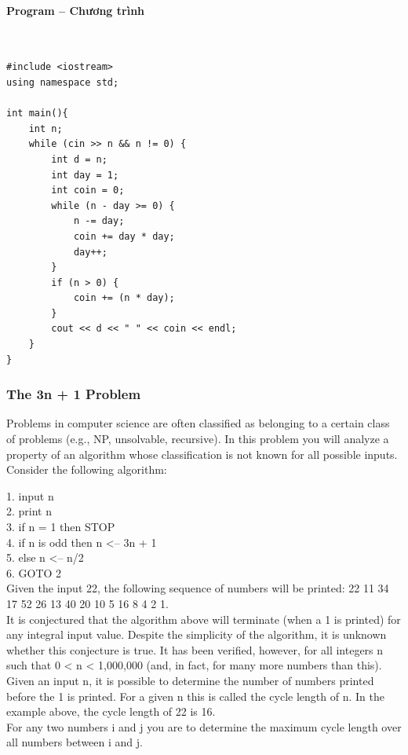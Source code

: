 \documentclass{article}
\begin{document}
\paragraph{Program -- Chương trình} \mbox{} \\


\begin{lstlisting}
#include <iostream>
using namespace std;

int main(){
	int n;
	while (cin >> n && n != 0) {
		int d = n;
		int day = 1;
		int coin = 0;
		while (n - day >= 0) {
			n -= day;
			coin += day * day;
			day++;
		}
		if (n > 0) {
			coin += (n * day);
		}
		cout << d << " " << coin << endl;
	}
}
\end{lstlisting}


\subsubsection{The 3n + 1 Problem}

Problems in computer science are often classified as belonging to a certain class of problems (e.g.,
NP, unsolvable, recursive). In this problem you will analyze a property of an algorithm whose classification is not known for all possible inputs.\\
Consider the following algorithm:

1. input n\\
2. print n\\
3. if n = 1 then STOP\\
4. if n is odd then n <-- 3n + 1\\
5. else n <-- n/2\\
6. GOTO 2\\

Given the input 22, the following sequence of numbers will be printed: 22 11 34 17 52 26 13
40 20 10 5 16 8 4 2 1.\\
It is conjectured that the algorithm above will terminate (when a 1 is printed) for any integral
input value. Despite the simplicity of the algorithm, it is unknown whether this conjecture is true. It has been verified, however, for all integers n such that 0 < n < 1,000,000 (and, in fact, for many
more numbers than this). \\
Given an input n, it is possible to determine the number of numbers printed before the 1 is
printed. For a given n this is called the cycle length of n. In the example above, the cycle length
of 22 is 16.\\
For any two numbers i and j you are to determine the maximum cycle length over all numbers
between i and j.
\end{document}
